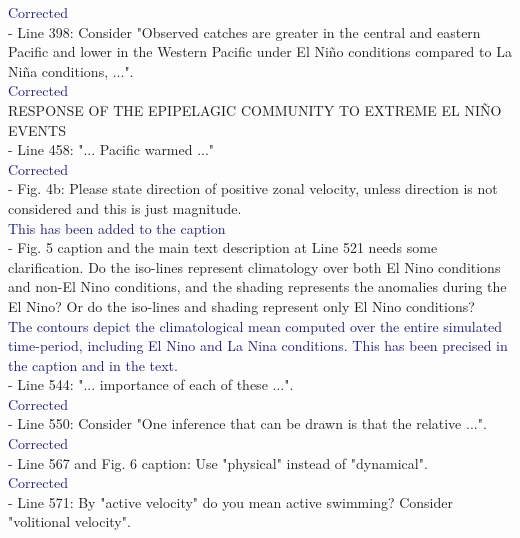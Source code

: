 \documentclass[12pt]{article}
\newcommand{\resp}[1]{\textcolor{MidnightBlue}{#1}}
\begin{document}
\resp{Corrected} \\

- Line 398: Consider "Observed catches are greater in the central and eastern Pacific and lower in the Western Pacific under El Niño conditions compared to La Niña conditions, ...".\\

\resp{Corrected} \\

RESPONSE OF THE EPIPELAGIC COMMUNITY TO EXTREME EL NIÑO EVENTS\\

- Line 458: "... Pacific warmed ..."\\

\resp{Corrected} \\

- Fig. 4b: Please state direction of positive zonal velocity, unless direction is not considered and this is just magnitude.\\

\resp{This has been added to the caption} \\

- Fig. 5 caption and the main text description at Line 521 needs some clarification. Do the iso-lines represent climatology over both El Nino conditions and non-El Nino conditions, and the shading represents the anomalies during the El Nino? Or do the iso-lines and shading represent only El Nino conditions?\\

\resp{The contours depict the climatological mean computed over the entire simulated time-period,  including El Nino and La Nina conditions. This has been precised in the caption and in the text.} \\

- Line 544: "... importance of each of these ...".\\

\resp{Corrected}\\

- Line 550: Consider "One inference that can be drawn is that the relative ...".\\

\resp{Corrected} \\

- Line 567 and Fig. 6 caption: Use "physical" instead of "dynamical".\\

\resp{Corrected} \\

- Line 571: By "active velocity" do you mean active swimming? Consider "volitional velocity".\\
\end{document}
